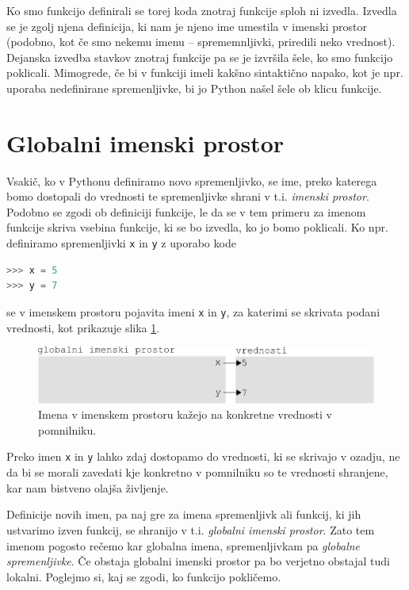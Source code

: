 Ko smo funkcijo definirali se torej koda znotraj funkcije sploh ni izvedla. Izvedla se je zgolj njena definicija, ki nam je njeno ime umestila v imenski prostor (podobno, kot če smo nekemu imenu -- sprememnljivki, priredili neko vrednost). Dejanska izvedba stavkov znotraj funkcije pa se je izvršila šele, ko smo funkcijo poklicali. Mimogrede, če bi v funkciji imeli kakšno sintaktično napako, kot je npr. uporaba nedefinirane spremenljivke, bi jo Python našel šele ob klicu funkcije.

\section{Globalni imenski prostor}
Vsakič, ko v Pythonu definiramo novo spremenljivko, se ime, preko katerega bomo dostopali do vrednosti te spremenljivke shrani v t.i. \emph{imenski prostor}. Podobno se zgodi ob definiciji funkcije, le da se v tem primeru za imenom funkcije skriva vsebina funkcije, ki se bo izvedla, ko jo bomo poklicali. Ko npr. definiramo spremenljivki \texttt{x} in \texttt{y} z uporabo kode
\begin{lstlisting}[language=Python]
>>> x = 5
>>> y = 7
\end{lstlisting}
se v imenskem prostoru pojavita imeni \texttt{x} in \texttt{y}, za katerimi se skrivata podani vrednosti, kot prikazuje slika \ref{img:imenski_prostor_1}.
\begin{figure}
    \includegraphics[width=\linewidth]{img/imenski_prostor.pdf}
    \caption{Imena v imenskem prostoru kažejo na konkretne vrednosti v pomnilniku.}
    \label{img:imenski_prostor_1}
\end{figure}
Preko imen \texttt{x} in \texttt{y} lahko zdaj dostopamo do vrednosti, ki se skrivajo v ozadju, ne da bi se morali zavedati kje konkretno v pomnilniku so te vrednosti shranjene, kar nam bistveno olajša življenje.

Definicije novih imen, pa naj gre za imena spremenljivk ali funkcij, ki jih ustvarimo izven funkcij, se shranijo v t.i. \emph{globalni imenski prostor}. Zato tem imenom pogosto rečemo kar globalna imena, spremenljivkam pa \emph{globalne spremenljivke}. Če obstaja globalni imenski prostor pa bo verjetno obstajal tudi lokalni. Poglejmo si, kaj se zgodi, ko funkcijo pokličemo.

